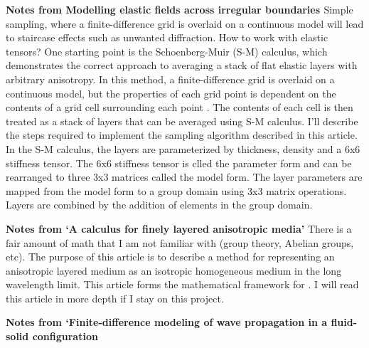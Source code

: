 \documentclass[11pt,titlepage]{article} %
\begin{document}
\textbf{Notes from Modelling elastic fields across irregular boundaries \cite{muir1992modeling}}
Simple sampling, where a finite-difference grid is overlaid on a continuous model will lead to staircase effects such as unwanted diffraction. How to work with elastic tensors? One starting point is the Schoenberg-Muir (S-M) calculus, which demonstrates the correct approach to averaging a stack of flat elastic layers with arbitrary anisotropy. In this method, a finite-difference grid is overlaid on a continuous model, but the properties of each grid point is dependent on the contents of a grid cell surrounding each point \cite{schoenberg1989calculus}. The contents of each cell is then treated as a stack of layers that can be averaged using S-M calculus. I'll describe the steps required to implement the sampling algorithm described in this article. In the S-M calculus, the layers are parameterized by thickness, density and a 6x6 stiffness
tensor. The 6x6 stiffness tensor is clled the parameter form and can be rearranged to three 3x3 matrices called the model form. The layer parameters are mapped from the model form to a group domain using 3x3 matrix operations. Layers are combined by the addition of elements in the group domain. 

\textbf{Notes from `A calculus for finely layered anisotropic media'\cite{schoenberg1989calculus}}
There is a fair amount of math that I am not familiar with (group theory, Abelian groups, etc). The purpose of this article is to describe a method for representing an anisotropic layered medium as an isotropic homogeneous medium in the long wavelength limit. This article forms the mathematical framework for \cite{muir1992modeling}. I will read this article in more depth if I stay on this project.

\textbf{Notes from `Finite-difference modeling of wave propagation in a fluid-solid configuration \cite{van2002finite}} 




\newpage

{}

\end{document}
